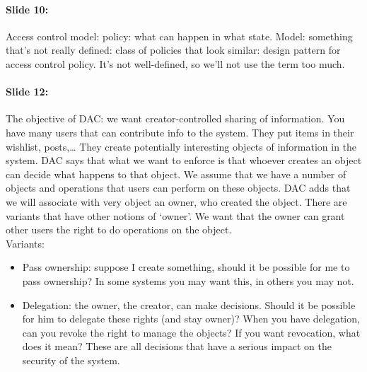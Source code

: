 \documentclass[10pt,a4paper]{report}
\begin{document}
\paragraph{Slide 10:} Access control model: policy: what can happen in what state. Model: something that's not really defined: class of policies that look similar: design pattern for access control policy. It's not well-defined, so we'll not use the term too much. 

\paragraph{Slide 12:} The objective of DAC: we want creator-controlled sharing of information. You have many users that can contribute info to the system. They put items in their wishlist, posts,… They create potentially interesting objects of information in the system. DAC says that what we want to enforce is that whoever creates an object can decide what happens to that object. We assume that we have a number of objects and operations that users can perform on these objects. DAC adds that we will associate with very object an owner, who created the object. There are variants that have other notions of `owner'. We want that the owner can grant other users the right to do operations on the object.\\
Variants:
\begin{itemize}
\item Pass ownership: suppose I create something, should it be possible for me to pass ownership? In some systems you may want this, in others you may not.
\item Delegation: the owner, the creator, can make decisions. Should it be possible for him to delegate these rights (and stay owner)? When you have delegation, can you revoke the right to manage the objects? If you want revocation, what does it mean? These are all decisions that have a serious impact on the security of the system.
\end{itemize}
\end{document}
